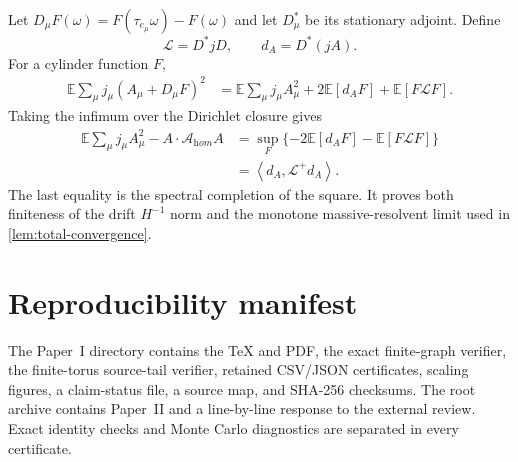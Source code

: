 \documentclass[11pt]{article}
\theoremstyle{definition}
\theoremstyle{remark}
\newcommand{\E}{\mathbb E}
\newcommand{\cA}{\mathcal A}
\newcommand{\ip}[2]{\left\langle #1,#2\right\rangle}
\begin{document}
Let $D_\mu F(\omega)=F(\tau_{e_\mu}\omega)-F(\omega)$ and let $D_\mu^*$ be its stationary adjoint.  Define
\begin{equation}
 \mathscr L=D^*jD,
 \qquad
 d_A=D^*(jA).
\end{equation}
For a cylinder function $F$,
\begin{align}
 \E\sum_\mu j_\mu(A_\mu+D_\mu F)^2
 &=\E\sum_\mu j_\mu A_\mu^2
 +2\E[d_AF]+\E[F\mathscr LF].
\end{align}
Taking the infimum over the Dirichlet closure gives
\begin{align}
 \E\sum_\mu j_\mu A_\mu^2-A\cdot\cA_{\mathrm hom}A
 &=\sup_F\{-2\E[d_AF]-\E[F\mathscr LF]\}\\
 &=\ip{d_A}{\mathscr L^+d_A}.
\end{align}
The last equality is the spectral completion of the square.  It proves both finiteness of the drift $H^{-1}$ norm and the monotone massive-resolvent limit used in \cref{lem:total-convergence}.


\section{Reproducibility manifest}
\label{app:manifest}

The Paper~I directory contains the TeX and PDF, the exact finite-graph verifier,
the finite-torus source-tail verifier, retained CSV/JSON certificates, scaling
figures, a claim-status file, a source map, and SHA-256 checksums.  The root
archive contains Paper~II and a line-by-line response to the external review.
Exact identity checks and Monte Carlo diagnostics are separated in every
certificate.
\end{document}
